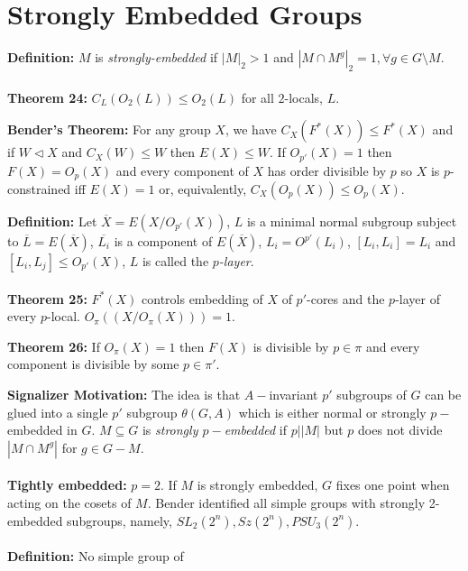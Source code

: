 \section {Strongly Embedded Groups}
{\bf Definition:}  $M$ is \emph{strongly-embedded} if
$|M|_2 > 1$ and $|M \cap M^g|_2=1, \forall g \in G \setminus M$.
\\
\\
{\bf Theorem 24:}
$C_L(O_2(L)) \le O_2(L)$ for all
$2$-locals, $L$.
\begin{quote}
\end{quote}
{\bf Bender's Theorem:} For any group $X$, we have $C_X(F^*(X)) \le F^*(X)$ and if
$W \lhd X$ and $C_X(W) \le W$ then $E(X) \le W$.  If $O_{p'}(X)=1$ then
$F(X)=O_p(X)$ and every component of $X$ has order divisible by $p$ so
$X$ is $p$-constrained iff $E(X)=1$ or, equivalently, $C_X(O_p(X)) \le O_p(X)$.
\begin{quote}
\end{quote}
{\bf Definition:}
Let ${\overline X}= E(X/O_{p'}(X))$, $L$ is a minimal normal subgroup subject to ${\overline L}= E({\overline X})$,
${\overline {L_i}}$ is a component of $E({\overline X})$, $L_i= O^{p'}(L_i)$,
$[L_i, L_i]= L_i$ and $[L_i, L_j] \le O_{p'}(X)$, $L$ is called the \emph{ $p$-layer}. \\
\\
{\bf Theorem 25:}
$F^*(X)$ controls embedding of $X$ of
$p'$-cores and the $p$-layer of every $p$-local.  $O_{\pi}((X/O_{\pi}(X)))=1$.
\begin{quote}
\end{quote}
{\bf Theorem 26:}
If $O_{\pi}(X)=1$ then $F(X)$ is divisible by $p \in \pi$ and every component is
divisible by some $p \in \pi'$.
\begin{quote}
\end{quote}
{\bf Signalizer Motivation:}  The idea is that
$A-$invariant $p'$ subgroups of $G$ can be glued into a single $p'$
subgroup $\theta(G,A)$ which is either normal or strongly $p-$embedded in $G$.
$M \subseteq G$ is \emph{ strongly $p-$embedded} if $p | |M|$ but $p$ does not divide
$|M \cap M^g |$ for $g \in G-M$.
\\
\\
{\bf Tightly embedded:} $p=2$. If $M$ is strongly
embedded, $G$ fixes one point when acting on the cosets of $M$.
Bender identified all simple groups with strongly 2-embedded subgroups, namely,
$SL_2(2^n), Sz(2^n), PSU_3(2^n)$.
\\
\\
{\bf Definition:}
No simple group of
